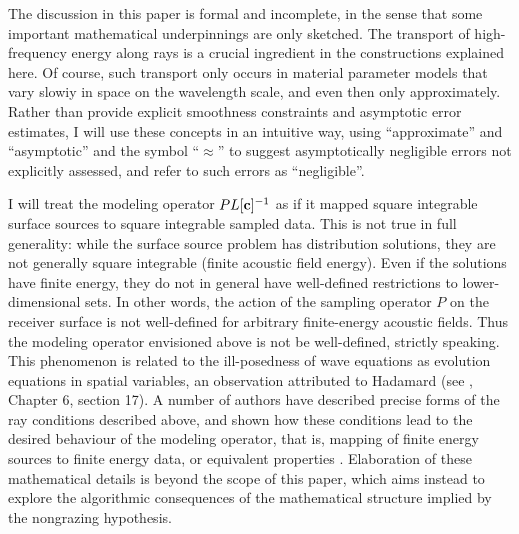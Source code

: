\documentclass[georeport,12pt]{geophysics}
\begin{document}
The discussion in this paper is formal and incomplete, in the sense
that some important mathematical underpinnings are only
sketched. The transport of high-frequency energy along rays is a
crucial ingredient in the constructions explained here. Of course,
such transport only occurs in material parameter models that vary
slowiy in space on the wavelength scale, and even then only
approximately. Rather than provide explicit
smoothness constraints and asymptotic error estimates, I will use
these concepts in an intuitive way, using ``approximate'' and
``asymptotic'' and the symbol ``$\approx$'' to suggest asymptotically
negligible errors not explicitly assessed, and refer to such errors as
``negligible''.

I will treat the modeling operator $PL[{\bf c}]^{-1}$ as if
it mapped square integrable surface sources to square integrable sampled
data. This is not true in full generality: while the surface source
problem has distribution solutions, they are not generally square
integrable (finite acoustic field energy). Even if the solutions have
finite energy, they do not in general have well-defined
restrictions to lower-dimensional sets. In other words, the action of
the sampling
operator $P$ on the receiver surface is not well-defined for arbitrary
finite-energy acoustic fields. Thus the modeling operator envisioned above
is not be well-defined, strictly speaking.
This phenomenon is related to the ill-posedness of wave equations as
evolution equations in spatial variables, an observation attributed to
Hadamard (see \cite{CourHil:62}, Chapter 6, section 17). A number of
authors have described precise forms of the ray conditions described
above, and shown how these conditions lead to the desired behaviour of
the modeling operator, that is, mapping of finite energy sources to
finite energy data, or equivalent properties
\cite{Payn:75,Symes:83,Lasi:86,LasLionsTrig:86,Lasi:87, BaoSy:91b}.
Elaboration of these mathematical details is beyond the scope of this
paper, which aims instead to explore the algorithmic consequences of
the mathematical structure implied by the nongrazing hypothesis.

\end{document}
